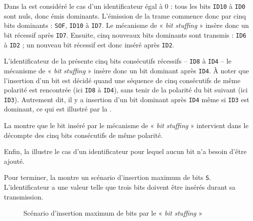 Dans la  est considéré le cas d'un identificateur égal à $0$ : tous les bits \texttt{ID10} à \texttt{ID0} sont nuls, donc émis dominants. L'émission de la trame commence donc par cinq bits dominants : \texttt{SOF}, \texttt{ID10} à \texttt{ID7}. Le mécanisme de « \emph{bit stuffing} » insère donc un bit récessif après \texttt{ID7}. Ensuite, cinq nouveaux bits dominants sont transmis : \texttt{ID6} à \texttt{ID2} ; un nouveau bit récessif est donc inséré après \texttt{ID2}.

L'identificateur de la  présente cinq bits consécutifs récessifs -- \texttt{ID8} à \texttt{ID4} -- le mécanisme de « \emph{bit stuffing} » insère donc un bit dominant après \texttt{ID4}. À noter que l'insertion d'un bit est décidé quand une séquence de cinq consécutifs de même polarité est rencontrée (ici \texttt{ID8} à \texttt{ID4}), sans tenir de la polarité du bit suivant (ici \texttt{ID3}). Autrement dit, il y a insertion d'un bit dominant après \texttt{ID4} même si \texttt{ID3} est dominant, ce qui est illustré par la .

La  montre que le bit inséré par le mécanisme de « \emph{bit stuffing} » intervient dans le décompte des cinq bits consécutifs de même polarité. 


Enfin, la  illustre le cas d'un identificateur pour lequel aucun bit n'a besoin d'être ajouté.

Pour terminer, la  montre un scénario d'insertion maximum de bits \texttt{S}. L'identificateur a une valeur telle que trois bits doivent être insérés durant sa transmission.

\begin{figure}[ht]
  \centering
  \caption{Scénario d'insertion maximum de bits par le « \emph{bit stuffing} »}
\end{figure}



